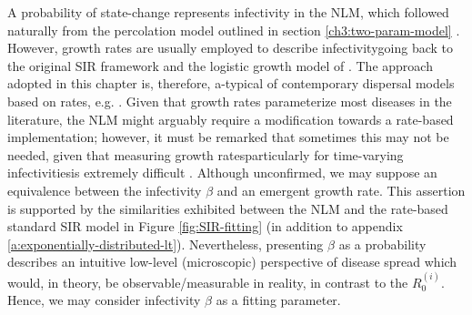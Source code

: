 A probability of state-change represents infectivity in the NLM, which followed naturally from the percolation model outlined in section \ref{ch3:two-param-model} \cite{OROZCOFUENTES201912}.
However, growth rates are usually employed to describe infectivity\textemdash going back to the original SIR framework \cite{kermack-model} and the logistic growth model of \cite{van2013plant}.
The approach adopted in this chapter is, therefore, a-typical of contemporary dispersal models based on rates, e.g. \cite{fabre2021optimising, control-theory, white2017modelling, large-scale-control}.
Given that growth rates parameterize most diseases in the literature, the NLM might arguably require a modification towards a rate-based implementation;
however, it must be remarked that sometimes this may not be needed, given that measuring growth rates\textemdash particularly for time-varying infectivities\textemdash is extremely difficult \cite{13-challenges}.
Although unconfirmed, we may suppose an equivalence between the infectivity $\beta$ and an emergent growth rate. This assertion is supported by the similarities exhibited between the NLM and the rate-based standard SIR model in Figure \ref{fig:SIR-fitting} (in addition to appendix \ref{a:exponentially-distributed-lt}).
Nevertheless, presenting $\beta$ as a probability describes an intuitive low-level (microscopic) perspective of disease spread which would, 
in theory, be observable/measurable in reality, in contrast to the $R_0^{(i)}$.
Hence, we may consider infectivity $\beta$ as a fitting parameter.


\newpage
